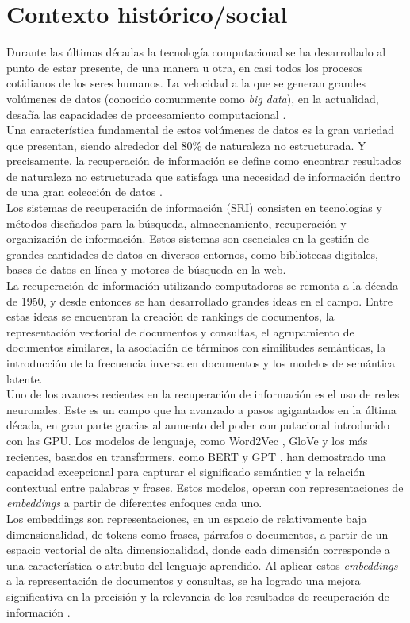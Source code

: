 \section{Contexto histórico/social} %
Durante las últimas décadas la tecnología computacional se ha desarrollado al punto de estar presente, de una manera u otra, en casi todos los procesos cotidianos de los seres humanos. La velocidad a la que se generan grandes volúmenes de datos (conocido comunmente como \textit{big data}), en la actualidad, desafía las capacidades de procesamiento computacional \cite{RiseofBigData}.\\
Una característica fundamental de estos volúmenes de datos es la gran variedad que presentan, siendo alrededor del 80$\%$ de naturaleza no estructurada. Y precisamente, la recuperación de información se define como encontrar resultados de naturaleza no estructurada que satisfaga una necesidad de información dentro de una gran colección de datos \cite{manning2008introductiontoIR}.\\
Los sistemas de recuperación de información (SRI) consisten en tecnologías y métodos diseñados para la búsqueda, almacenamiento, recuperación y organización de información. Estos sistemas son esenciales en la gestión de grandes cantidades de datos en diversos entornos, como bibliotecas digitales, bases de datos en línea y motores de búsqueda en la web.\\ 
La recuperación de información utilizando computadoras  se remonta a la década de 1950, y desde entonces se han desarrollado grandes ideas en el campo. Entre estas ideas se encuentran la creación de rankings de documentos, la representación vectorial de documentos y consultas, el agrupamiento de documentos similares, la asociación de términos con similitudes semánticas, la introducción de la frecuencia inversa en documentos y los modelos de semántica latente.\cite{SRIConf1}\\
Uno de los avances recientes en la recuperación de información es el uso de redes neuronales. Este es un campo que ha avanzado a pasos agigantados en la última década, en gran parte gracias al aumento del poder computacional introducido con las GPU. Los modelos de lenguaje, como Word2Vec \cite{Mikolov2013EfficientEO}, GloVe \cite{Pennington2014GloVeGV} y los más recientes, basados en transformers, como BERT \cite{Devlin2019BERTPO} y GPT \cite{Radford2018ImprovingLU}, han demostrado una capacidad excepcional para capturar el significado semántico y la relación contextual entre palabras y frases. Estos modelos, operan con representaciones de \textit{embeddings} a partir de diferentes enfoques cada uno.\\
Los embeddings son representaciones, en un espacio de relativamente baja dimensionalidad, de tokens como frases, párrafos o documentos, a partir de un espacio vectorial de alta dimensionalidad, donde cada dimensión corresponde a una característica o atributo del lenguaje aprendido. Al aplicar estos \textit{embeddings} a la representación de documentos y consultas, se ha logrado una mejora significativa en la precisión y la relevancia de los resultados de recuperación de información \cite{docEmbReview}.\\ 

